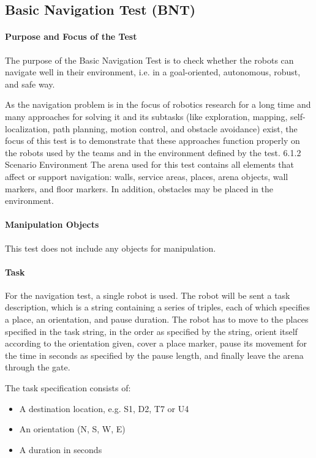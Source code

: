 \subsection{Basic Navigation Test (BNT)}

\paragraph{Purpose and Focus of the Test}
The purpose of the Basic Navigation Test is to check whether the robots can navigate well in their environment, i.e. in a goal-oriented, autonomous, robust, and safe way.
\par
As the navigation problem is in the focus of robotics research for a long time and many approaches for solving it and its subtasks (like exploration, mapping, self-localization, path planning, motion control, and obstacle avoidance) exist, the focus of this test is to demonstrate that these approaches function properly on the robots used by the teams and in the environment defined by the test.
6.1.2 Scenario Environment
The arena used for this test contains all elements that affect or support navigation: walls, service areas, places, arena objects, wall markers, and floor markers. In addition, obstacles may be placed in the environment.
\par
\paragraph{Manipulation Objects}
This test does not include any objects for manipulation.
\paragraph{Task}
For the navigation test, a single robot is used. The robot will be sent a task description, which is a string containing a series of triples, each of which specifies a place, an orientation, and pause duration. The robot has to move to the places specified in the task string, in the order as specified by the string, orient itself according to the orientation given, cover a place marker, pause its movement for the time in seconds as specified by the pause length, and finally leave the arena through the gate.

The task specification consists of:

\begin{itemize}
	\item A destination location, e.g. S1, D2, T7 or U4
	\item An orientation (N, S, W, E)
	\item A duration in seconds
\end{itemize}


